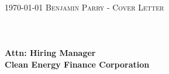 \documentclass[localFont,alternative]{yaac-another-awesome-cv}
\begin{document}
	\makecvheader

	\makecvfooter
		{\textsc{\today}} 
		{\textsc{Benjamin Parry - Cover Letter}}
		{\thepage}
	\\
	\\
	\\
	\\
	\textbf{Attn: Hiring Manager}
	\\
	\textbf{Clean Energy Finance Corporation}
	\\
	\\
	\\
	
	\\
	
\end{document}
